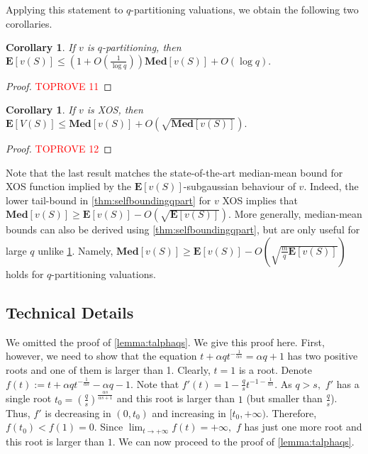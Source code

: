 \documentclass[11pt]{article}\usepackage{amsfonts}
\newtheorem{corollary}[theorem]{Corollary}
\numberwithin{theorem}{subsection}
\newcommand{\median}{\mathbf{Med}}
\newcommand{\expect}{\mathbf{E}}
\begin{document}
\noindent
Applying this statement to $q$-partitioning valuations, we obtain the following two corollaries.

\begin{corollary}
\label{cor:medianmeanqpart}
If $v$ is $q$-partitioning, then 
$\expect[v(S)]\le (1 + O(\frac{1}{\log q}))\median[v(S)] + O(\log q).$
\end{corollary}
\begin{proof}\textcolor{red}{TOPROVE 11}\end{proof}

\begin{corollary}
If $v$ is XOS, 
then $\expect[V(S)]\le \median[v(S)] + O(\sqrt{\median[v(S)]}).$
\end{corollary}
\begin{proof}\textcolor{red}{TOPROVE 12}\end{proof}

\noindent
Note that the last result matches the state-of-the-art median-mean bound for XOS function implied by the $\expect[v(S)]$-subgaussian behaviour of $v.$ Indeed, the lower tail-bound in \cref{thm:selfboundingqpart} for $v$ XOS
implies that $\median[v(S)]\ge \expect[v(S)] - 
O(\sqrt{\expect[v(S)]}).
$ More generally, median-mean bounds can also be derived using \cref{thm:selfboundingqpart}, but are only useful for large $q$ unlike \cref{cor:medianmeanqpart}. Namely,
 $\median[v(S)]\ge \expect[v(S)] - 
O(\sqrt{\frac{m}{q}\expect[v(S)]})
$ holds for $q$-partitioning valuations. 

\subsection{Technical Details}
\label{section:appendixtalphaqs}
We omitted the proof of \cref{lemma:talphaqs}. We give this proof here. First, however, we need to show that the equation $t + \alpha q t^{-\frac{1}{\alpha s}} = \alpha q + 1$ has two positive roots and one of them is larger than 1. Clearly, $t = 1$ is a root. Denote $f(t):= t + \alpha q t^{-\frac{1}{\alpha s}}-\alpha q - 1.$ Note that 
$f'(t) = 1 - \frac{q}{s}t^{-1-\frac{1}{\alpha s}}.$ As $q>s,$ $f'$ has a single root $t_0 = \left(\frac{q}{s}\right)^\frac{\alpha s}{\alpha s + 1}$ and this root is larger than $1$ (but smaller than $\frac{q}{s}$). Thus, $f'$ is decreasing in $(0,t_0) $ and increasing in $[t_0, +\infty).$ Therefore, $f(t_0)<f(1) = 0.$ Since $\lim_{t\longrightarrow+\infty} f(t) =+\infty,$ $f$ has just one more root and this root is larger than $1.$ We can now proceed to the proof of \cref{lemma:talphaqs}.
\end{document}
